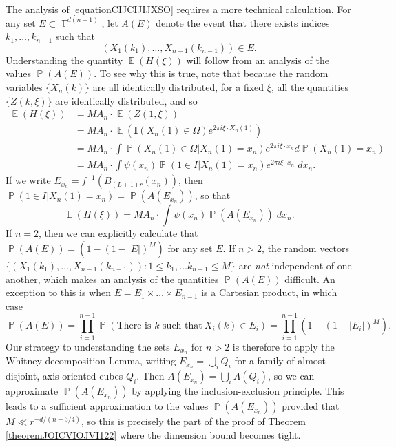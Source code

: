\documentclass[dvipsnames,letterpaper,12pt]{article}
\numberwithin{equation}{section}
\DeclareMathOperator{\TT}{\mathbb{T}}
\numberwithin{theorem}{section}
\DeclareMathOperator{\EE}{\mathbb{E}}
\DeclareMathOperator{\PP}{\mathbb{P}}
\begin{document}
The analysis of \eqref{equationCIJCIJIJXSO} requires a more technical calculation. For any set $E \subset \TT^{d(n-1)}$, let $A(E)$ denote the event that there exists indices $k_1,\dots, k_{n-1}$ such that
%
\[ (X_1(k_1), \dots, X_{n-1}(k_{n-1})) \in E. \]
%
Understanding the quantity $\EE(H(\xi))$ will follow from an analysis of the values $\PP(A(E))$. To see why this is true, note that because the random variables $\{ X_n(k) \}$ are all identically distributed, for a fixed $\xi$, all the quantities $\{ Z(k,\xi) \}$ are identically distributed, and so
%
\begin{align*}
    \EE(H(\xi)) &= M A_n \cdot \EE(Z(1,\xi))\\
    &= M A_n \cdot \EE( \mathbf{I}(X_n(1) \in \Omega) e^{2 \pi i \xi \cdot X_n(1)} )\\
    &= M A_n \cdot \int \PP(X_n(1) \in \Omega | X_n(1) = x_n) e^{2 \pi i \xi \cdot x_n} d\PP(X_n(1) = x_n)\\
    &= M A_n \cdot \int \psi(x_n) \PP(1 \in I | X_n(1) = x_n) e^{2 \pi i \xi \cdot x_n}\; dx_n.
\end{align*}
%
If we write $E_{x_n} = f^{-1}(B_{(L+1)r}(x_n))$, then $\PP(1 \in I | X_n(1) = x_n) = \PP(A(E_{x_n}))$, so that
%
\[ \EE(H(\xi)) = MA_n \cdot \int \psi(x_n) \PP(A(E_{x_n}))\; dx_n. \]
%
If $n = 2$, then we can explicitly calculate that $\PP(A(E)) = (1 - (1 - |E|)^M)$ for any set $E$. If $n > 2$, the random vectors $\{ (X_1(k_1), \dots, X_{n-1}(k_{n-1})) : 1 \leq k_1, \dots k_{n-1} \leq M \}$ are \emph{not} independent of one another, which makes an analysis of the quantities $\PP(A(E))$ difficult. An exception to this is when $E = E_1 \times \dots \times E_{n-1}$ is a Cartesian product, in which case
%
\[ \PP(A(E)) = \prod_{i = 1}^{n-1} \PP(\text{There is $k$ such that}\ X_i(k) \in E_i) = \prod_{i = 1}^{n-1} (1 - (1 - |E_i|)^M). \]
%
Our strategy to understanding the sets $E_{x_n}$ for $n > 2$ is therefore to apply the Whitney decomposition Lemma, writing $E_{x_n} = \bigcup_i Q_i$ for a family of almost disjoint, axis-oriented cubes $Q_i$. Then $A(E_{x_n}) = \bigcup_i A(Q_i)$, so we can approximate $\PP(A(E_{x_n}))$ by applying the inclusion-exclusion principle. This leads to a sufficient approximation to the values $\PP(A(E_{x_n}))$ provided that $M \ll r^{-d/(n-3/4)}$, so this is precisely the part of the proof of Theorem \ref{theoremJOICVIOJVI122} where the dimension bound becomes tight.
\end{document}
